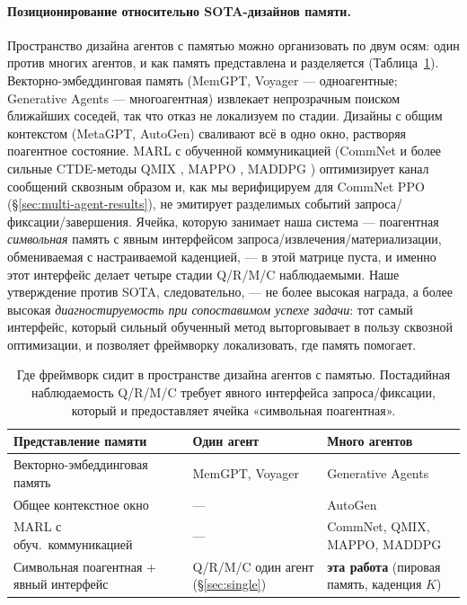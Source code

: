 \documentclass{article}
\begin{document}
\paragraph{Позиционирование относительно SOTA-дизайнов памяти.}
Пространство дизайна агентов с памятью можно организовать по двум осям: один против многих агентов, и как память представлена и разделяется (Таблица~\ref{tab:sota-quadrants}). Векторно-эмбеддинговая память (MemGPT, Voyager --- одноагентные; Generative Agents --- многоагентная) извлекает непрозрачным поиском ближайших соседей, так что отказ не локализуем по стадии. Дизайны с общим контекстом (MetaGPT, AutoGen) сваливают всё в одно окно, растворяя поагентное состояние. MARL с обученной коммуникацией (CommNet и более сильные CTDE-методы QMIX \citep{rashid2018qmix}, MAPPO \citep{yu2022mappo}, MADDPG \citep{lowe2017maddpg}) оптимизирует канал сообщений сквозным образом и, как мы верифицируем для CommNet PPO (\S\ref{sec:multi-agent-results}), не эмитирует разделимых событий запроса/фиксации/завершения. Ячейка, которую занимает наша система --- поагентная \emph{символьная} память с явным интерфейсом запроса/извлечения/материализации, обмениваемая с настраиваемой каденцией, --- в этой матрице пуста, и именно этот интерфейс делает четыре стадии Q/R/M/C наблюдаемыми. Наше утверждение против SOTA, следовательно, --- не более высокая награда, а более высокая \emph{диагностируемость при сопоставимом успехе задачи}: тот самый интерфейс, который сильный обученный метод выторговывает в пользу сквозной оптимизации, и позволяет фреймворку локализовать, где память помогает.

\begin{table}[h]
\caption{Где фреймворк сидит в пространстве дизайна агентов с памятью. Постадийная наблюдаемость Q/R/M/C требует явного интерфейса запроса/фиксации, который и предоставляет ячейка «символьная поагентная».}
\label{tab:sota-quadrants}
\centering
\small
\begin{tabular}{p{3.1cm} p{4.3cm} p{4.3cm}}
\toprule
Представление памяти & Один агент & Много агентов \\
\midrule
Векторно-эмбеддинговая память & MemGPT, Voyager \citep{packer2023memgpt,wang2023voyager} & Generative Agents \citep{park2023generative} \\
Общее контекстное окно & --- & AutoGen \citep{wu2023autogen} \\
MARL с обуч.\ коммуникацией & --- & CommNet, QMIX, MAPPO, MADDPG \citep{sukhbaatar2016commnet,rashid2018qmix,yu2022mappo,lowe2017maddpg} \\
Символьная поагентная + явный интерфейс & Q/R/M/C один агент (\S\ref{sec:single}) & \textbf{эта работа} (пировая память, каденция $K$) \\
\bottomrule
\end{tabular}
\end{table}
\end{document}
